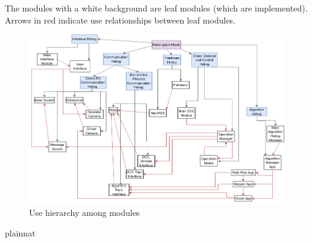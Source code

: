 \documentclass[12pt, titlepage]{article}
\begin{document}
The modules with a white background are leaf modules (which are implemented). Arrows in red indicate use relationships between leaf modules.

\begin{figure}[H]
\centering
\includegraphics[width=1\textwidth]{UsesHierarchy.png}
\caption{Use hierarchy among modules}
\label{FigUH}
\end{figure}


 {plainnat}

\end{document}
